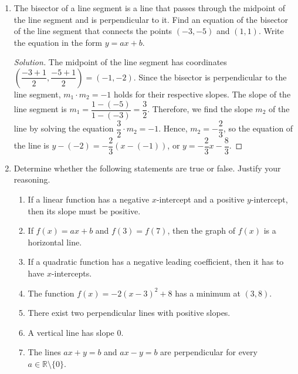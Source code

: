 \documentclass[12pt]{article}
\newenvironment{solution}{\begin{proof}[Solution]}{\end{proof}}
\begin{document}
\begin{enumerate}
\begin{solution}
\begin{itemize}
					Since the intercepts are equal, we set $\dfrac{1}{2}=-\dfrac{1}{k}$, so $k=-2$.
				\end{itemize}
			\end{solution}

			\item The bisector of a line segment is a line that passes through the midpoint of the line segment and is perpendicular to it. Find an equation of the bisector of the line segment that connects the points $(-3,-5)$ and $(1,1)$. Write the equation in the form $y=ax+b$.
			\begin{solution}
				The midpoint of the line segment has coordinates $\left(\dfrac{-3+1}{2},\dfrac{-5+1}{2}\right)=(-1,-2)$. Since the bisector is perpendicular to the line segment, $m_1\cdot m_2=-1$ holds for their respective slopes. The slope of the line segment is $m_1=\dfrac{1-(-5)}{1-(-3)}=\dfrac{3}{2}$. Therefore, we find the slope $m_2$ of the line by solving the equation $\dfrac{3}{2}\cdot m_2=-1$. Hence, $m_2=-\dfrac{2}{3}$, so the equation of the line is $y-(-2)=-\dfrac{2}{3}(x-(-1))$, or $y=-\dfrac{2}{3}x-\dfrac{8}{3}$.
			\end{solution}
	
		
		\item Determine whether the following statements are true or false. Justify your reasoning.
		\begin{enumerate}
			\item If a linear function has a negative $x$-intercept and a positive $y$-intercept, then its slope must be positive.
		
			\item If $f(x)=ax+b$ and $f(3)=f(7)$, then the graph of $f(x)$ is a horizontal line.
		
			\item If a quadratic function has a negative leading coefficient, then it has to have $x$-intercepts.
		
			\item The function $f(x)=-2(x-3)^2+8$ has a minimum at $(3,8)$.
		
			\item There exist two perpendicular lines with positive slopes.
		
			\item A vertical line has slope 0.
			
			\item The lines $ax+y=b$ and $ax-y=b$ are perpendicular for every $a\in\mathbb{R}\setminus\{0\}$.
			

\end{enumerate}
\end{enumerate}
\end{document}
